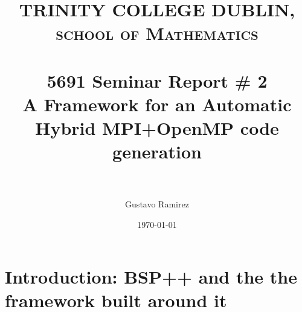 \documentclass[paper=a4, fontsize=11pt]{scrartcl} %
\title{	
\normalfont \normalsize 
\textsc{TRINITY COLLEGE DUBLIN, school of Mathematics} \\ [25pt] %
\horrule{0.5pt} \\[0.4cm] %
\huge 5691 Seminar Report \# 2 \\ A Framework for an Automatic Hybrid MPI+OpenMP code generation \\ %
\horrule{2pt} \\[0.5cm] %
}
\author{Gustavo Ramirez} %
\date{\normalsize\today} %
\numberwithin{equation}{section} %
\numberwithin{figure}{section} %
\numberwithin{table}{section} %
\begin{document}
\maketitle %

\newpage

\section{Introduction: BSP++ and the the framework built around it}
\end{document}
